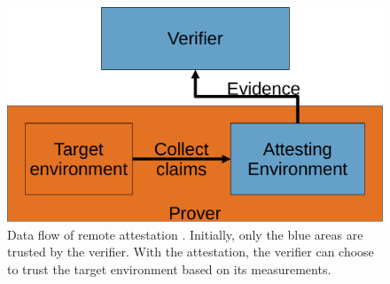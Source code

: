 \begin{figure}[htpb]
  \centering
  \includegraphics[width=0.5\linewidth]{figures/remote_attestation.pdf}
  \caption{Data flow of remote attestation \cite{rfc9334}. Initially, only the blue areas are trusted by the verifier. With the attestation, the verifier can choose to trust the target environment based on its measurements.} \label{fig:ra}
\end{figure}
